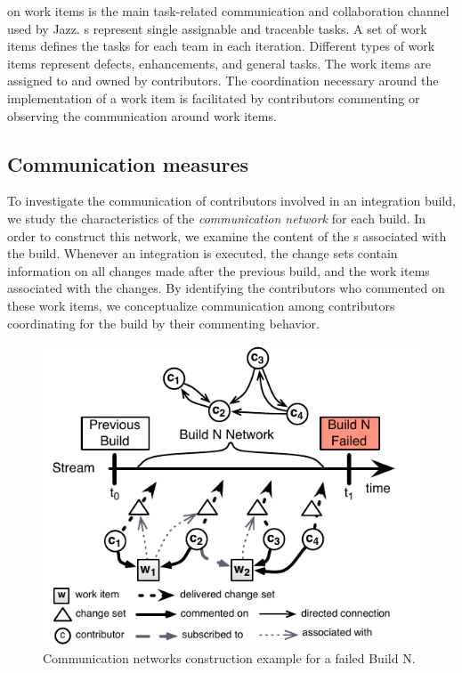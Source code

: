  on work items is the main task-related communication and
collaboration channel used by Jazz. s represent single assignable
and traceable tasks. A set of work items defines the tasks for each team in each
iteration. Different types of work items represent defects, enhancements, and
general tasks. The work items are assigned to and owned by contributors. The
coordination necessary around the implementation of a work item is facilitated by
contributors commenting or observing the communication around work items.

\subsection{Communication measures}
To investigate the communication of contributors involved in an integration
build, we study the characteristics of the \emph{communication network} for each
build. In order to construct this network, we examine the content of the
s associated with the build. Whenever an integration is executed,
the change sets contain information on all changes made after the previous build,
and the work items associated with the changes. By identifying the contributors
who commented on these work items, we conceptualize communication among
contributors coordinating for the build by their commenting behavior.


\begin{figure}[t]
\begin{center}
\includegraphics[width=\columnwidth]{figures/BuildResultNetworks3}
\caption{Communication networks construction example for a failed Build N.}
\label{fig:NetworkConstructionExample}
\end{center}
\end{figure}

